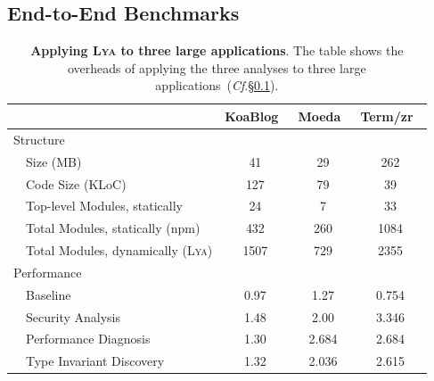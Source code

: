 \documentclass[letterpaper,twocolumn,10pt]{article}
\newcommand{\cf}[1]{(\emph{Cf}.\S\ref{#1})}
\newcommand{\sys}{{\scshape Lya}\xspace}
\begin{document}
\subsection{End-to-End Benchmarks}
\label{macro}

\begin{table}[b]
\center
\footnotesize
\setlength\tabcolsep{3pt}
\caption{
  \footnotesize{
    \textbf{Applying \sys to three large applications}.
    The table shows the overheads of applying the three analyses to three large applications~\cf{macro}.
  }
}
\begin{tabular*}{\columnwidth}{l @{\extracolsep{\fill}} ccc}
\toprule
                                     & KoaBlog~\cite{koa}    & Moeda~\cite{moeda}   &  Term/zr~\cite{terminalizer} \\
\midrule
Structure                            &                   &                      &              \\
~~Size (MB)                          & 41                &  29                  &   262        \\
~~Code Size (KLoC)                   & 127               &  79                  &   39         \\
~~Top-level Modules, statically      &  24               &  7                   &    33         \\
~~Total Modules, statically (npm)    &  432              &  260                 &    1084       \\
~~Total Modules, dynamically (\sys)  &  1507             &   729                &     2355      \\
Performance                          &                   &                      &              \\
~~Baseline                           &  0.97             &  1.27                &    0.754      \\
~~Security Analysis                  &  1.48             &  2.00                &    3.346      \\
~~Performance Diagnosis              &  1.30             &  2.684               &    2.684      \\
~~Type Invariant Discovery           &  1.32             &  2.036               &    2.615      \\     
\bottomrule
\end{tabular*}
\label{tab:macro}
\vspace{-5mm}
\end{table}
\end{document}
